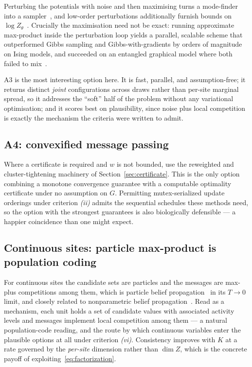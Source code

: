 Perturbing the potentials with noise and then maximising turns a mode-finder into a sampler~\citep{Papandreou2011}, and low-order perturbations additionally furnish bounds on $\log Z_{\theta}$~\citep{Hazan2012}. Crucially the maximisation need not be exact: running approximate max-product inside the perturbation loop yields a parallel, scalable scheme that outperformed Gibbs sampling and Gibbs-with-gradients by orders of magnitude on Ising models, and succeeded on an entangled graphical model where both failed to mix~\citep{LazaroGredilla2021}.

A3 is the most interesting option here. It is fast, parallel, and assumption-free; it returns distinct \emph{joint} configurations across draws rather than per-site marginal spread, so it addresses the ``soft'' half of the problem without any variational optimisation; and it scores best on plausibility, since noise plus local competition is exactly the mechanism the criteria were written to admit.

\subsection{A4: convexified message passing}

Where a certificate is required and $w$ is not bounded, use the reweighted and cluster-tightening machinery of Section~\ref{sec:certificate}. This is the only option combining a monotone convergence guarantee with a computable optimality certificate under no assumption on $G$. Permitting mutex-serialized update orderings under criterion \emph{(ii)} admits the sequential schedules these methods need, so the option with the strongest guarantees is also biologically defensible --- a happier coincidence than one might expect.

\subsection{Continuous sites: particle max-product is population coding}

For continuous sites the candidate sets are particles and the messages are max-plus competitions among them, which is particle belief propagation~\citep{Ihler2009} in its $T \rightarrow 0$ limit, and closely related to nonparametric belief propagation~\citep{Sudderth2003}. Read as a mechanism, each unit holds a set of candidate values with associated activity levels and messages implement local competition among them --- a natural population-code reading, and the route by which continuous variables enter the plausible options at all under criterion \emph{(vi)}. Consistency improves with $K$ at a rate governed by the \emph{per-site} dimension rather than $\dim Z$, which is the concrete payoff of exploiting~\eqref{eq:factorization}.

